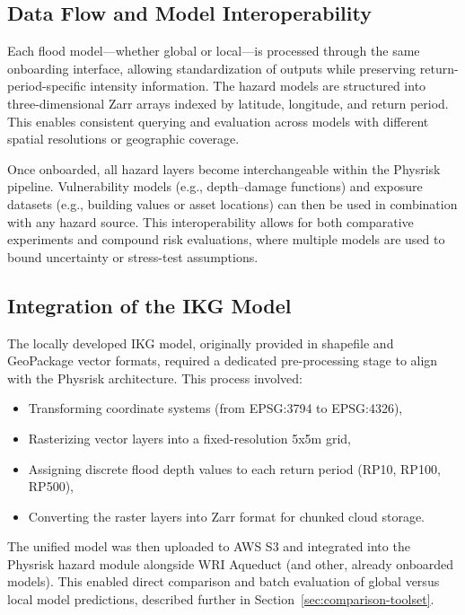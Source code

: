 \subsection{Data Flow and Model Interoperability}

Each flood model—whether global or local—is processed through the same onboarding interface, allowing standardization of outputs while preserving return-period-specific intensity information. The hazard models are structured into three-dimensional Zarr arrays indexed by latitude, longitude, and return period. This enables consistent querying and evaluation across models with different spatial resolutions or geographic coverage.

Once onboarded, all hazard layers become interchangeable within the Physrisk pipeline. Vulnerability models (e.g., depth--damage functions) and exposure datasets (e.g., building values or asset locations) can then be used in combination with any hazard source. This interoperability allows for both comparative experiments and compound risk evaluations, where multiple models are used to bound uncertainty or stress-test assumptions.

\subsection{Integration of the IKG Model}

The locally developed IKG model, originally provided in shapefile and GeoPackage vector formats, required a dedicated pre-processing stage to align with the Physrisk architecture. This process involved:
\begin{itemize}
    \item Transforming coordinate systems (from EPSG:3794 to EPSG:4326),
    \item Rasterizing vector layers into a fixed-resolution 5x5m grid,
    \item Assigning discrete flood depth values to each return period (RP10, RP100, RP500),
    \item Converting the raster layers into Zarr format for chunked cloud storage.
\end{itemize}

The unified model was then uploaded to AWS S3 and integrated into the Physrisk hazard module alongside WRI Aqueduct (and other, already onboarded models). This enabled direct comparison and batch evaluation of global versus local model predictions, described further in Section~\ref{sec:comparison-toolset}.

